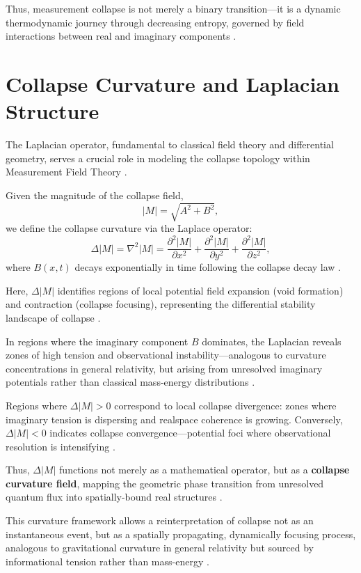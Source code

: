 Thus, measurement collapse is not merely a binary transition---it is a dynamic thermodynamic journey through decreasing entropy, governed by field interactions between real and imaginary components \cite{zurek_decoherence, penrose_gravity_1996, bassi_models_2013}.

\section{Collapse Curvature and Laplacian Structure}

The Laplacian operator, fundamental to classical field theory and differential geometry, serves a crucial role in modeling the collapse topology within Measurement Field Theory \cite{courant1941methods,arnold1989mathematical}.

Given the magnitude of the collapse field,
\[
|M| = \sqrt{A^2 + B^2},
\]
we define the collapse curvature via the Laplace operator:
\[
\Delta |M| = \nabla^2 |M| = \frac{\partial^2 |M|}{\partial x^2} + \frac{\partial^2 |M|}{\partial y^2} + \frac{\partial^2 |M|}{\partial z^2},
\]
where $B(x,t)$ decays exponentially in time following the collapse decay law \cite{bassi_models_2013, born1926quantum}.

Here, $\Delta |M|$ identifies regions of local potential field expansion (void formation) and contraction (collapse focusing), representing the differential stability landscape of collapse \cite{dirac1930principles}.

In regions where the imaginary component $B$ dominates, the Laplacian reveals zones of high tension and observational instability---analogous to curvature concentrations in general relativity, but arising from unresolved imaginary potentials rather than classical mass-energy distributions \cite{born1926quantum,wigner1963measurement}.

Regions where $\Delta |M| > 0$ correspond to local collapse divergence: zones where imaginary tension is dispersing and realspace coherence is growing. Conversely, $\Delta |M| < 0$ indicates collapse convergence---potential foci where observational resolution is intensifying \cite{penrose_gravity_1996, heisenberg1927}.

Thus, $\Delta |M|$ functions not merely as a mathematical operator, but as a \textbf{collapse curvature field}, mapping the geometric phase transition from unresolved quantum flux into spatially-bound real structures \cite{heisenberg1927,arnold1989mathematical}.

This curvature framework allows a reinterpretation of collapse not as an instantaneous event, but as a spatially propagating, dynamically focusing process, analogous to gravitational curvature in general relativity but sourced by informational tension rather than mass-energy \cite{bohm1951quantum, dirac1930principles}.

